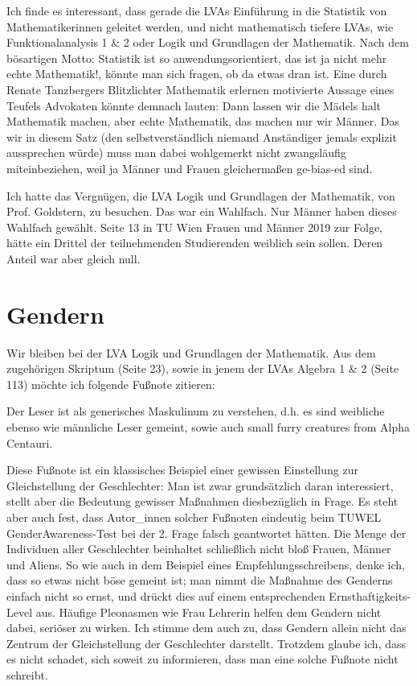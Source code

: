 \documentclass{article}
\newcommand{\Quote}[1]{\glqq #1\grqq{}}
\begin{document}
Ich finde es interessant, dass gerade die LVAs \Quote{Einführung in die Statistik} von Mathematikerinnen geleitet werden, und nicht mathematisch \Quote{tiefere} LVAs, wie \Quote{Funktionalanalysis 1 \& 2} oder \Quote{Logik und Grundlagen der Mathematik}.
Nach dem bösartigen Motto:
\Quote{Statistik ist so anwendungsorientiert, das ist ja nicht mehr echte Mathematik!},
könnte man sich fragen, ob da etwas dran ist.
Eine durch \Quote{Renate Tanzbergers Blitzlichter Mathematik erlernen} motivierte Aussage eines Teufels Advokaten könnte demnach lauten:
\Quote{Dann lassen wir die Mädels halt Mathematik machen, aber echte Mathematik, das machen nur wir Männer}.
Das \Quote{wir} in diesem Satz (den selbstverständlich niemand Anständiger jemals explizit aussprechen würde) muss man dabei wohlgemerkt nicht zwangsläufig miteinbeziehen, weil ja Männer und Frauen gleichermaßen ge-bias-ed sind.

Ich hatte das Vergnügen, die LVA \Quote{Logik und Grundlagen der Mathematik}, von Prof. Goldstern, zu besuchen.
Das war ein Wahlfach.
Nur Männer haben dieses Wahlfach gewählt.
Seite 13 in \Quote{TU Wien Frauen und Männer 2019} zur Folge, hätte ein Drittel der teilnehmenden Studierenden weiblich sein sollen.
Deren Anteil war aber gleich null.

\section*{Gendern}

Wir  bleiben bei der LVA \Quote{Logik und Grundlagen der Mathematik}.
Aus dem zugehörigen Skriptum (Seite 23), sowie in jenem der LVAs \Quote{Algebra 1 \& 2} (Seite 113) möchte ich folgende Fußnote zitieren:

\begin{center}
	Der \Quote{Leser} ist als generisches Maskulinum zu verstehen, d.h. es sind weibliche ebenso wie männliche Leser gemeint, sowie auch small furry creatures from Alpha Centauri.
\end{center}

Diese Fußnote ist ein klassisches Beispiel einer gewissen Einstellung zur Gleichstellung der Geschlechter:
Man ist zwar grundsätzlich daran interessiert, stellt aber die Bedeutung gewisser Maßnahmen diesbezüglich in Frage.
Es steht aber auch fest, dass Autor\_innen solcher Fußnoten eindeutig beim TUWEL GenderAwareness-Test bei der 2. Frage falsch geantwortet hätten.
Die Menge der \Quote{Individuen aller Geschlechter} beinhaltet schließlich nicht bloß Frauen, Männer und Aliens.
So wie auch in dem Beispiel eines Empfehlungsschreibens, denke ich, dass so etwas nicht böse gemeint ist;
man nimmt die Maßnahme des Genderns einfach nicht so ernst, und drückt dies auf einem entsprechenden \Quote{Ernsthaftigkeits-Level} aus.
Häufige Pleonasmen wie \Quote{Frau Lehrerin} helfen dem Gendern nicht dabei, seriöser zu wirken.
Ich stimme dem auch zu, dass Gendern allein nicht das Zentrum der Gleichstellung der Geschlechter darstellt.
Trotzdem glaube ich, dass es nicht schadet, sich soweit zu informieren, dass man eine solche Fußnote nicht schreibt.
\end{document}
